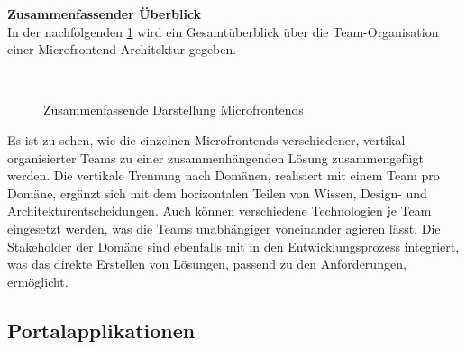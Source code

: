 \textbf{Zusammenfassender Überblick}\\
In der nachfolgenden \cref{fig:MicroFrontendBigPicture} wird ein Gesamtüberblick über die Team-Organisation einer Microfrontend-Architektur gegeben.

\begin{figure}[hbt!]
	\centering
	\begin{minipage}[t]{0.75\textwidth}	
		\caption{Zusammenfassende Darstellung Microfrontends}
		\\
		\label{fig:MicroFrontendBigPicture}
	\end{minipage}
\end{figure}

Es ist zu sehen, wie die einzelnen Microfrontends verschiedener, vertikal organisierter Teams zu einer zusammenhängenden Lösung zusammengefügt werden. Die vertikale Trennung nach Domänen, realisiert mit einem Team pro Domäne, ergänzt sich mit dem horizontalen Teilen von Wissen, Design- und Architekturentscheidungen. Auch können verschiedene Technologien je Team eingesetzt werden, was die Teams unabhängiger voneinander agieren lässt. Die Stakeholder der Domäne sind ebenfalls mit in den Entwicklungsprozess integriert, was das direkte Erstellen von Lösungen, passend zu den Anforderungen, ermöglicht.

\subsection{Portalapplikationen}\label{sec:Portalapplikationen}


